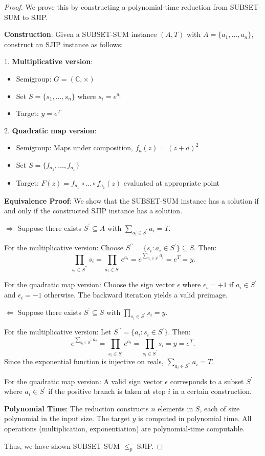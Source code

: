 \documentclass[12pt]{article}
\newcommand{\C}{\mathbb{C}}
\begin{document}
\begin{proof}
We prove this by constructing a polynomial-time reduction from SUBSET-SUM to SJIP.

\textbf{Construction}: Given a SUBSET-SUM instance $(A,T)$ with $A = \{a_{1},\ldots ,a_{n}\}$, construct an SJIP instance as follows:

1. \textbf{Multiplicative version}: 
\begin{itemize}
\item Semigroup: $G = (\C,\times)$
\item Set $S = \{s_{1},\ldots ,s_{n}\}$ where $s_{i} = e^{a_{i}}$
\item Target: $y = e^{T}$
\end{itemize}

2. \textbf{Quadratic map version}:
\begin{itemize}
\item Semigroup: Maps under composition, $f_{a}(z) = (z + a)^{2}$
\item Set $S = \{f_{a_{1}},\ldots ,f_{a_{n}}\}$
\item Target: $F(z) = f_{a_{n}}\circ \dots \circ f_{a_{1}}(z)$ evaluated at appropriate point
\end{itemize}

\textbf{Equivalence Proof}: We show that the SUBSET-SUM instance has a solution if and only if the constructed SJIP instance has a solution.

$\Rightarrow$ Suppose there exists $S^{\prime}\subseteq A$ with $\sum_{a_{i}\in S^{\prime}}a_{i} = T$.

For the multiplicative version: Choose $S^{\prime \prime} = \{s_{i}:a_{i}\in S^{\prime}\} \subseteq S$. Then:
\[
\prod_{s_{i}\in S^{\prime \prime}}s_{i} = \prod_{a_{i}\in S^{\prime}}e^{a_{i}} = e^{\sum_{a_{i}\in S^{\prime}}a_{i}} = e^{T} = y.
\]

For the quadratic map version: Choose the sign vector $\epsilon$ where $\epsilon_{i} = +1$ if $a_{i}\in S^{\prime}$ and $\epsilon_{i} = -1$ otherwise. The backward iteration yields a valid preimage.

$\Leftarrow$ Suppose there exists $S^{\prime}\subseteq S$ with $\prod_{s_{i}\in S^{\prime}}s_{i} = y$.

For the multiplicative version: Let $S^{\prime \prime} = \{a_{i}:s_{i}\in S^{\prime}\}$. Then:
\[
e^{\sum_{a_{i}\in S^{\prime \prime}}a_{i}} = \prod_{s_{i}\in S^{\prime}}e^{a_{i}} = \prod_{s_{i}\in S^{\prime}}s_{i} = y = e^{T}.
\]
Since the exponential function is injective on reals, $\sum_{a_{i}\in S^{\prime \prime}}a_{i} = T$.

For the quadratic map version: A valid sign vector $\epsilon$ corresponds to a subset $S^{\prime}$ where $a_{i}\in S^{\prime}$ if the positive branch is taken at step $i$ in a certain construction.

\textbf{Polynomial Time}: The reduction constructs $n$ elements in $S$, each of size polynomial in the input size. The target $y$ is computed in polynomial time. All operations (multiplication, exponentiation) are polynomial-time computable.

Thus, we have shown SUBSET-SUM $\leq_{p}$ SJIP.
\end{proof}
\end{document}
